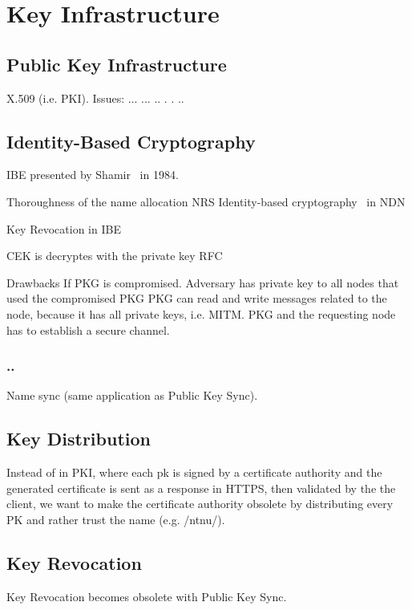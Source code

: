\chapter{Key Infrastructure}

\section{Public Key Infrastructure}
X.509 (i.e. \gls{PKI}). Issues: ... ... .. . . ..

\section{Identity-Based Cryptography}\label{ibc}
\gls{IBE} presented by Shamir~\cite{DBLP:conf/crypto/Shamir84} in 1984.

Thoroughness of the name allocation \gls{NRS} 
Identity-based cryptography~\cite{DBLP:conf/icnp/ZhangCXWSW11} in \gls{NDN}

Key Revocation in IBE ~\cite{DBLP:journals/iacr/BoldyrevaGK12} 

\gls{CEK} is decryptes with the private key
RFC~\cite{rfc5408}

Drawbacks
If \gls{PKG} is compromised. Adversary has private key to all nodes that used the compromised \gls{PKG}
\gls{PKG} can read and write messages related to the node, because it has all private keys, i.e. \gls{MITM}.
\gls{PKG} and the requesting node has to establish a secure channel. 

\subsection{..}
Name sync (same application as Public Key Sync).


\section{Key Distribution}
Instead of in \gls{PKI}, where each pk is signed by a certificate authority and the generated certificate is sent as a response in \gls{HTTPS}, then validated by the the client, we want to make the certificate authority obsolete by distributing every PK and rather trust the name (e.g. /ntnu/). 

\section{Key Revocation}
Key Revocation becomes obsolete with Public Key Sync. 
